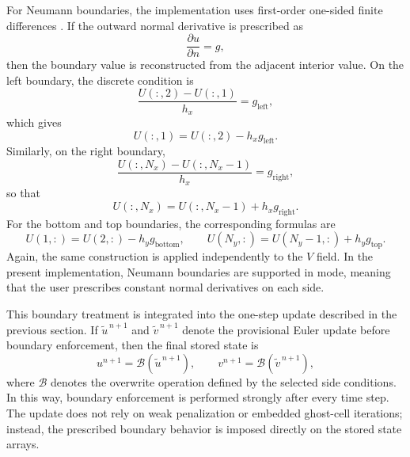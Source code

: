 For Neumann boundaries, the implementation uses first-order one-sided finite differences \cite{leveque2007}. If the outward normal derivative is prescribed as
\[
\frac{\partial u}{\partial n} = g,
\]
then the boundary value is reconstructed from the adjacent interior value. On the left boundary, the discrete condition is
\begin{equation}
\frac{U(:,2)-U(:,1)}{h_x} = g_{\mathrm{left}},
\label{eq:neumann_left_numimpl}
\end{equation}
which gives
\begin{equation}
U(:,1) = U(:,2) - h_x g_{\mathrm{left}}.
\label{eq:neumann_left_update_numimpl}
\end{equation}
Similarly, on the right boundary,
\begin{equation}
\frac{U(:,N_x)-U(:,N_x-1)}{h_x} = g_{\mathrm{right}},
\label{eq:neumann_right_numimpl}
\end{equation}
so that
\begin{equation}
U(:,N_x) = U(:,N_x-1) + h_x g_{\mathrm{right}}.
\label{eq:neumann_right_update_numimpl}
\end{equation}
For the bottom and top boundaries, the corresponding formulas are
\begin{equation}
U(1,:) = U(2,:) - h_y g_{\mathrm{bottom}},
\qquad
U(N_y,:) = U(N_y-1,:) + h_y g_{\mathrm{top}}.
\label{eq:neumann_vertical_update_numimpl}
\end{equation}
Again, the same construction is applied independently to the $V$ field. In the present implementation, Neumann boundaries are supported in  mode, meaning that the user prescribes constant normal derivatives on each side.

This boundary treatment is integrated into the one-step update described in the previous section. If $\widetilde{u}^{\,n+1}$ and $\widetilde{v}^{\,n+1}$ denote the provisional Euler update before boundary enforcement, then the final stored state is
\begin{equation}
u^{n+1} = \mathcal{B}\!\left(\widetilde{u}^{\,n+1}\right),
\qquad
v^{n+1} = \mathcal{B}\!\left(\widetilde{v}^{\,n+1}\right),
\label{eq:bc_overwrite_operator_numimpl}
\end{equation}
where $\mathcal{B}$ denotes the overwrite operation defined by the selected side conditions. In this way, boundary enforcement is performed strongly after every time step. The update does not rely on weak penalization or embedded ghost-cell iterations; instead, the prescribed boundary behavior is imposed directly on the stored state arrays.

